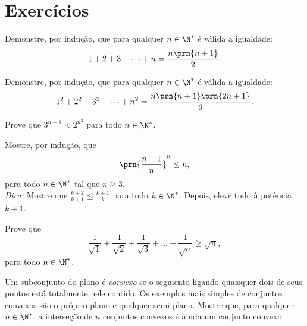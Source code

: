 \section{Exercícios}

\begin{exercise}
    Demonstre, por indução, que para qualquer $n \in \N^*$ é
válida a igualdade:
$$1+2+ 3+ \dots + n = \frac{n \prn{n+1}} 2.$$ 
\end{exercise}

\begin{exercise}
    Demonstre, por indução, que para qualquer $n \in \N^*$ é
válida a igualdade:
$$1^2 +2^2 + 3^2+ \dots + n^2 = \frac{n \prn {n+1} \prn{2n+1}} 6.$$ 
\end{exercise}

\begin{exercise}
    Prove que $3^{n-1} < 2^{n^2}$ para todo $n \in \N^\ast$.
\end{exercise}

\begin{exercise}
    Mostre, por indução, que $$\prn{\frac {n+1}{n}}^n \leq n,$$
para todo $n \in \N^*$ tal que $n \ge 3$. \\ \emph{Dica: }
Mostre que $\frac{k+2}{k+1} \le \frac{k+1} k$ para todo $k \in
\N^*$. Depois, eleve tudo à potência $k+1$.
\end{exercise}

\begin{exercise}
    Prove que $$\frac 1 {\sqrt 1} +\frac 1 {\sqrt 2} +\frac 1 {\sqrt
3} + \dots + \frac 1 {\sqrt n} \ge \sqrt n,$$ para todo $ n \in
\N^*$.
\end{exercise}

\begin{exercise}
    Um subconjunto do plano é \emph{convexo} se o segmento ligando
quaisquer dois de seus pontos está totalmente nele contido. Os
exemplos mais simples de conjuntos convexos são o próprio plano e
qualquer semi-plano. Mostre que, para qualquer $n \in \N^*$, a
interseção de $n$ conjuntos convexos é ainda um conjunto convexo.
\end{exercise}